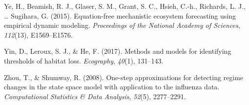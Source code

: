 \documentclass[12pt,twoside,openany]{reedthesis}
\begin{document}
\leavevmode\hypertarget{ref-ye2015equation}{}%
Ye, H., Beamish, R. J., Glaser, S. M., Grant, S. C., Hsieh, C.-h., Richards, L. J., \ldots{} Sugihara, G. (2015). Equation-free mechanistic ecosystem forecasting using empirical dynamic modeling. \emph{Proceedings of the National Academy of Sciences}, \emph{112}(13), E1569--E1576.

\leavevmode\hypertarget{ref-yin2017methods}{}%
Yin, D., Leroux, S. J., \& He, F. (2017). Methods and models for identifying thresholds of habitat loss. \emph{Ecography}, \emph{40}(1), 131--143.

\leavevmode\hypertarget{ref-zhou2008one}{}%
Zhou, T., \& Shumway, R. (2008). One-step approximations for detecting regime changes in the state space model with application to the influenza data. \emph{Computational Statistics \& Data Analysis}, \emph{52}(5), 2277--2291.
\end{document}
